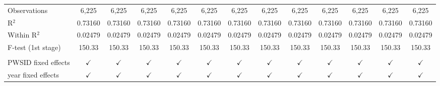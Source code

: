 \begin{table}[htbp]
\begin{adjustbox}{width = \textwidth, center}
\begin{tabular}{lcccccccccccc}
          \\
         Observations                             & 6,225                   & 6,225                  & 6,225                                & 6,225                        & 6,225                         & 6,225                        & 6,225                                      & 6,225                              & 6,225                        & 6,225                       & 6,225                                     & 6,225\\  
         R$^2$                                    & 0.73160                 & 0.73160                & 0.73160                              & 0.73160                      & 0.73160                       & 0.73160                      & 0.73160                                    & 0.73160                            & 0.73160                      & 0.73160                     & 0.73160                                   & 0.73160\\  
         Within R$^2$                             & 0.02479                 & 0.02479                & 0.02479                              & 0.02479                      & 0.02479                       & 0.02479                      & 0.02479                                    & 0.02479                            & 0.02479                      & 0.02479                     & 0.02479                                   & 0.02479\\  
         F-test (1st stage)                       & 150.33                  & 150.33                 & 150.33                               & 150.33                       & 150.33                        & 150.33                       & 150.33                                     & 150.33                             & 150.33                       & 150.33                      & 150.33                                    & 150.33\\  
          \\
         PWSID fixed effects                      & $\checkmark$            & $\checkmark$           & $\checkmark$                         & $\checkmark$                 & $\checkmark$                  & $\checkmark$                 & $\checkmark$                               & $\checkmark$                       & $\checkmark$                 & $\checkmark$                & $\checkmark$                              & $\checkmark$\\   
         year fixed effects                       & $\checkmark$            & $\checkmark$           & $\checkmark$                         & $\checkmark$                 & $\checkmark$                  & $\checkmark$                 & $\checkmark$                               & $\checkmark$                       & $\checkmark$                 & $\checkmark$                & $\checkmark$                              & $\checkmark$\\   
         \bottomrule
      \end{tabular}
   \end{adjustbox}
\end{table}


